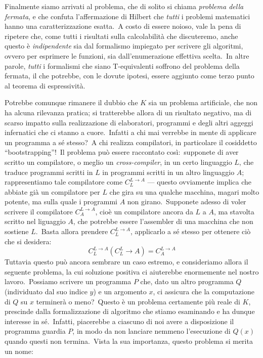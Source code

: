 \noindent Finalmente siamo arrivati al problema, che di solito si chiama \textit{problema della fermata}, e che confuta l'affermazione di Hilbert che \textit{tutti} i problemi matematici hanno una caratterizzazione esatta.\
A costo di essere noioso, vale la pena di ripetere che, come tutti i risultati sulla calcolabilità che discuteremo, anche questo è \textit{indipendente} sia dal formalismo impiegato per scrivere gli algoritmi, ovvero per esprimere le funzioni, sia dall'enumerazione effettiva scelta.\
In altre parole, \textit{tutti} i formalismi che siano T-equivalenti soffrono del problema della fermata, il che potrebbe, con le dovute ipotesi, essere aggiunto come terzo punto al teorema di espressività.\

Potrebbe comunque rimanere il dubbio che $K$ sia un problema artificiale, che non ha alcuna rilevanza pratica; si tratterebbe allora di un risultato negativo, ma di scarso impatto sulla realizzazione di elaboratori, programmi e degli altri aggeggi infernatici che ci stanno a cuore.\
Infatti a chi mai verrebbe in mente di applicare un programma a sé stesso?\
A chi realizza compilatori, in particolare il cosiddetto ``bootstrapping''!\
Il problema può essere raccontato così:\ supponete di aver scritto un compilatore, o meglio un \textit{cross-compiler}, in un certo linguaggio $L$, che traduce programmi scritti in $L$ in programmi scritti in un altro linguaggio $A$; rappresentiamo tale compilatore come $C_L^{L \rightarrow A}$ --- questo ovviamente implica che abbiate già un compilatore per $L$ che gira su una qualche macchina, magari molto potente, ma sulla quale i programmi $A$ non girano.\
Supponete adesso di voler scrivere il compilatore $C_A^{L\rightarrow A}$, cioè un compilatore ancora da $L$ a $A$, ma stavolta scritto nel liguaggio $A$, che potrebbe essere l'assembler di una macchina che non sostiene $L$.\
Basta allora prendere $C_L^{L\rightarrow A}$, applicarlo a sé stesso per ottenere ciò che si desidera:
\[C_L^{L\rightarrow A} (C_L^L\rightarrow A) = C_A^{L\rightarrow A}\]
Tuttavia questo può ancora sembrare un caso estremo, e consideriamo allora il seguente problema, la cui soluzione positiva ci aiuterebbe enormemente nel nostro lavoro.\
Possiamo scrivere un programma $P$ che, dato un altro programma $Q$ (individuato dal suo indice $y$) e un argomento $x$, ci assicura che la computazione di $Q$ su $x$ terminerà o meno?\
Questo è un problema certamente più reale di  $K$, prescinde dalla formalizzazione di algoritmo che stiamo esaminando e ha dunque interesse in sé.\
Infatti, piacerebbe a ciascuno di noi avere a disposizione il programma guardia $P$, in modo da non lanciare nemmeno l'esecuzione di $Q(x)$ quando questi non termina.\
Vista la sua importanza, questo problema si merita un nome:\

